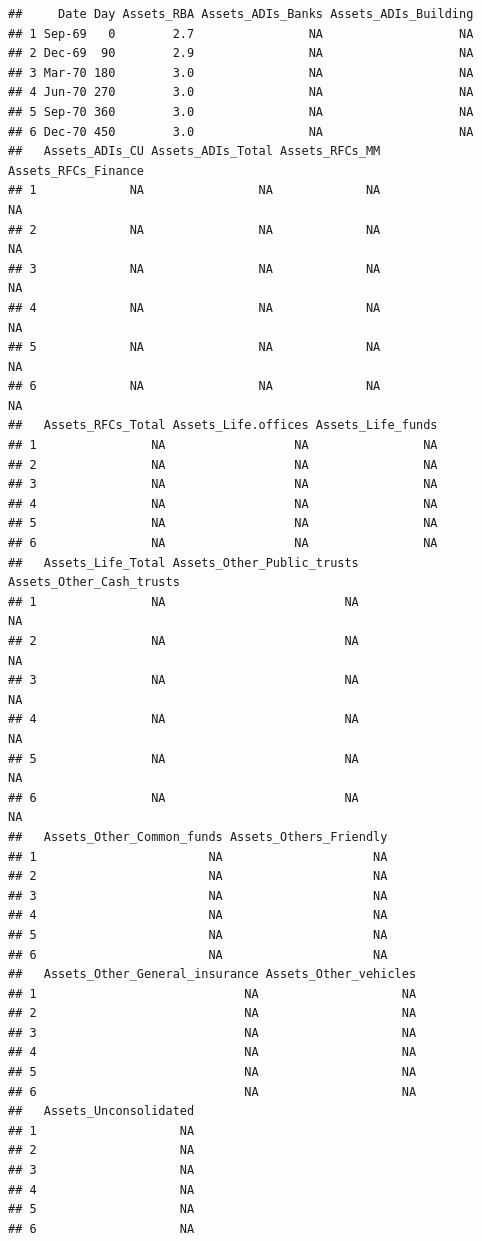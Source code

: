 \documentclass[]{book}
\begin{document}
\begin{verbatim}
##     Date Day Assets_RBA Assets_ADIs_Banks Assets_ADIs_Building
## 1 Sep-69   0        2.7                NA                   NA
## 2 Dec-69  90        2.9                NA                   NA
## 3 Mar-70 180        3.0                NA                   NA
## 4 Jun-70 270        3.0                NA                   NA
## 5 Sep-70 360        3.0                NA                   NA
## 6 Dec-70 450        3.0                NA                   NA
##   Assets_ADIs_CU Assets_ADIs_Total Assets_RFCs_MM Assets_RFCs_Finance
## 1             NA                NA             NA                  NA
## 2             NA                NA             NA                  NA
## 3             NA                NA             NA                  NA
## 4             NA                NA             NA                  NA
## 5             NA                NA             NA                  NA
## 6             NA                NA             NA                  NA
##   Assets_RFCs_Total Assets_Life.offices Assets_Life_funds
## 1                NA                  NA                NA
## 2                NA                  NA                NA
## 3                NA                  NA                NA
## 4                NA                  NA                NA
## 5                NA                  NA                NA
## 6                NA                  NA                NA
##   Assets_Life_Total Assets_Other_Public_trusts Assets_Other_Cash_trusts
## 1                NA                         NA                       NA
## 2                NA                         NA                       NA
## 3                NA                         NA                       NA
## 4                NA                         NA                       NA
## 5                NA                         NA                       NA
## 6                NA                         NA                       NA
##   Assets_Other_Common_funds Assets_Others_Friendly
## 1                        NA                     NA
## 2                        NA                     NA
## 3                        NA                     NA
## 4                        NA                     NA
## 5                        NA                     NA
## 6                        NA                     NA
##   Assets_Other_General_insurance Assets_Other_vehicles
## 1                             NA                    NA
## 2                             NA                    NA
## 3                             NA                    NA
## 4                             NA                    NA
## 5                             NA                    NA
## 6                             NA                    NA
##   Assets_Unconsolidated
## 1                    NA
## 2                    NA
## 3                    NA
## 4                    NA
## 5                    NA
## 6                    NA
\end{verbatim}
\end{document}
